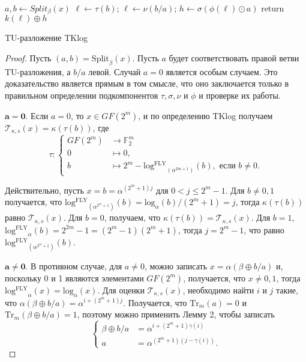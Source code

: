 \begin{algorithm}[htp!]
  $a, b \gets Split_{\beta}(x)$ 
   {
    $\ell \gets \tau(b)$;
  }{
    $\ell \gets \nu(b/a)$;
  }
  $h \gets \sigma(\phi(\ell) \odot a)$ 
  return $k(\ell) \oplus h$ 
\caption{TU-разложение TKlog}
\label{alg:alg02}
\end{algorithm}

\begin{proof}
Пусть \((a, b) = \mathrm{Split}_{\beta}(x)\). Пусть \(a\) будет соответствовать правой ветви TU-разложения, а \(b/a\) левой. Случай \(a = 0\) является особым случаем. Это доказательство является прямым в том смысле, что оно заключается только в правильном определении подкомпонентов \(\tau, \sigma, \nu\) и \(\phi\) и проверке их работы.

$\bm{a=0.}$ Если \(a = 0\), то \(x \in GF(2^m)\), и по определению TKlog получаем \(\mathscr{T}_{\kappa, s}(x) = \kappa(\tau(b))\), где
\[
\tau : 
\begin{cases}
GF(2^m) & \to \mathbb{F}^m_2 \\
0 & \mapsto 0, \\
b & \mapsto 2^m - \mathrm{log^{FLY}}_{(\alpha^{2m+1})}(b), \text{ если } b \neq 0.
\end{cases}
\]

Действительно, пусть \(x = b = \alpha^{(2^m+1)j}\) для \(0 < j \leq 2^m - 1\). Для \(b \neq 0, 1\) получается, что \(\mathrm{log^{FLY}}_{(\alpha^{2^m+1})}(b) = \mathrm{log}_{\alpha}(b)/(2^m + 1) = j\), тогда \(\kappa(\tau(b))\) равно \(\mathscr{T}_{\kappa, s}(x)\). Для \(b = 0\), получаем, что \(\kappa(\tau(b)) = \mathscr{T}_{\kappa, s}(x)\). Для \(b = 1\), \(\mathrm{log^{FLY}}_{\alpha}(b) = 2^{2m} - 1 = (2^m - 1)(2^m + 1)\), тогда \(j = 2^m - 1\), что равно \(\mathrm{log^{FLY}}_{(\alpha^{2^m+1})}(b)\).

$\bm{a \neq 0.}$ В противном случае, для \(a \neq 0\), можно записать \(x = \alpha(\beta \oplus b/a)\) и, поскольку 0 и 1 являются элементами \(GF(2^m)\), получается, что \(x \neq 0, 1\), тогда \(\mathrm{log^{FLY}}_{\alpha}(x) = \mathrm{log}_{\alpha}(x)\). Для оценки \(\mathscr{T}_{\kappa,s}(x)\), необходимо найти \(i\) и \(j\) такие, что \(\alpha(\beta \oplus b/a) = \alpha^{i+(2^m+1)j}\). Получается, что \(\mathrm{Tr}_m(a) = 0\) и \(\mathrm{Tr}_m(\beta \oplus b/a) = 1\), поэтому можно применить Лемму 2, чтобы записать
\begin{equation}
  \begin{cases}
    \beta \oplus b/a & = \alpha^{i+(2^m+1)\gamma(i)} \\
    a & = \alpha^{(2^m+1)(j-\gamma(i))}.
  \end{cases}
  \label{eq:03}
\end{equation}


\end{proof}
